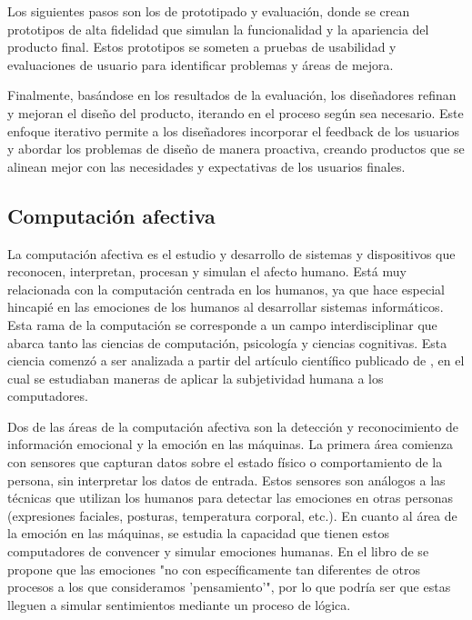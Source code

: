 Los siguientes pasos son los de prototipado y evaluación, donde se crean prototipos de alta fidelidad que simulan la funcionalidad y la apariencia del producto final. Estos prototipos se someten a pruebas de usabilidad y evaluaciones de usuario para identificar problemas y áreas de mejora.

Finalmente, basándose en los resultados de la evaluación, los diseñadores refinan y mejoran el diseño del producto, iterando en el proceso según sea necesario. Este enfoque iterativo permite a los diseñadores incorporar el feedback de los usuarios y abordar los problemas de diseño de manera proactiva, creando productos que se alinean mejor con las necesidades y expectativas de los usuarios finales.

\subsection{Computación afectiva}

La computación afectiva es el estudio y desarrollo de sistemas y dispositivos que reconocen, interpretan, procesan y simulan el afecto humano. Está muy relacionada con la computación centrada en los humanos, ya que hace especial hincapié en las emociones de los humanos al desarrollar sistemas informáticos. Esta rama de la computación se corresponde a un campo interdisciplinar que abarca tanto las ciencias de computación, psicología y ciencias cognitivas. Esta ciencia comenzó a ser analizada a partir del artículo científico publicado de \cite{picard1995computer}, en el cual se estudiaban maneras de aplicar la subjetividad humana a los computadores.

Dos de las áreas de la computación afectiva son la detección y reconocimiento de información emocional y la emoción en las máquinas. La primera área comienza con sensores que capturan datos sobre el estado físico o comportamiento de la persona, sin interpretar los datos de entrada. Estos sensores son análogos a las técnicas que utilizan los humanos para detectar las emociones en otras personas (expresiones faciales, posturas, temperatura corporal, etc.). En cuanto al área de la emoción en las máquinas, se estudia la capacidad que tienen estos computadores de convencer y simular emociones humanas. En el libro de \cite{minsky2007emotion} se propone que las emociones "no con específicamente tan diferentes de otros procesos a los que consideramos 'pensamiento'", por lo que podría ser que estas lleguen a simular sentimientos mediante un proceso de lógica.

